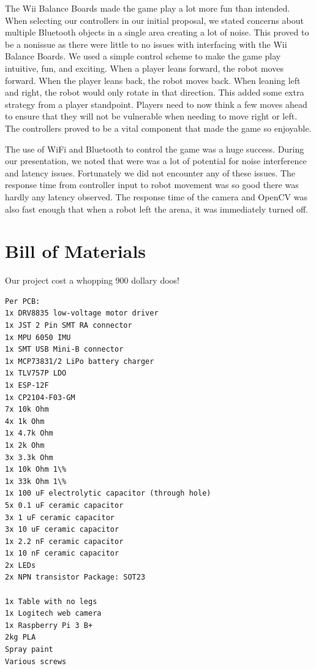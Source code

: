 \documentclass[11pt]{ieeeconf}
\begin{document}
The Wii Balance Boards made the game play a lot more fun than intended. When selecting our controllers in our initial proposal, we stated concerns about multiple Bluetooth objects in a single area creating a lot of noise. This proved to be a nonissue as there were little to no issues with interfacing with the Wii Balance Boards. We used a simple control scheme to make the game play intuitive, fun, and exciting. When a player leans forward, the robot moves forward. When the player leans back, the robot moves back. When leaning left and right, the robot would only rotate in that direction. This added some extra strategy from a player standpoint. Players need to now think a few moves ahead to ensure that they will not be vulnerable when needing to move right or left. The controllers proved to be a vital component that made the game so enjoyable.

The use of WiFi and Bluetooth to control the game was a huge success. During our presentation, we noted that were was a lot of potential for noise interference and latency issues. Fortunately we did not encounter any of these issues. The response time from controller input to robot movement was so good there was hardly any latency observed. The response time of the camera and OpenCV was also fast enough that when a robot left the arena, it was immediately turned off. 

\section{Bill of Materials}

Our project cost a whopping 900 dollary doos!%
\begin{lstlisting}
Per PCB:
1x DRV8835 low-voltage motor driver
1x JST 2 Pin SMT RA connector
1x MPU 6050 IMU
1x SMT USB Mini-B connector
1x MCP73831/2 LiPo battery charger
1x TLV757P LDO
1x ESP-12F
1x CP2104-F03-GM
7x 10k Ohm 
4x 1k Ohm 
1x 4.7k Ohm 
1x 2k Ohm 
3x 3.3k Ohm 
1x 10k Ohm 1\%
1x 33k Ohm 1\%
1x 100 uF electrolytic capacitor (through hole)
5x 0.1 uF ceramic capacitor 
3x 1 uF ceramic capacitor 
3x 10 uF ceramic capacitor 
1x 2.2 nF ceramic capacitor 
1x 10 nF ceramic capacitor 
2x LEDs
2x NPN transistor Package: SOT23

1x Table with no legs
1x Logitech web camera
1x Raspberry Pi 3 B+
2kg PLA
Spray paint
Various screws
\end{lstlisting}
\end{document}
